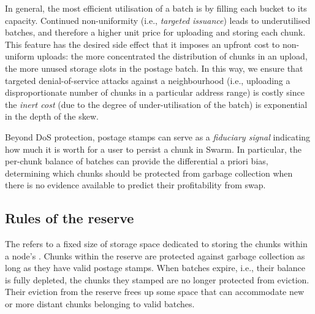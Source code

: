 In general, the most efficient utilisation of a batch is by filling each bucket to its capacity. 
%
%
%       
Continued non-uniformity (i.e., \emph{targeted issuance}) leads to underutilised batches, and therefore a higher unit price for uploading and storing each chunk. This feature has the desired side effect that it imposes an upfront cost to non-uniform uploads: the more concentrated the distribution of chunks in an upload, the more unused storage slots in the postage batch. In this way, we ensure that targeted denial-of-service attacks against a neighbourhood (i.e., uploading a disproportionate number of chunks in a particular address range) is costly since the \emph{inert cost} (due to the degree of under-utilisation of the batch) is exponential in the depth of the skew.

Beyond DoS protection, postage stamps can serve as a \emph{fiduciary signal} indicating how much it is worth for a user to persist a chunk in Swarm. In particular, the per-chunk balance of batches can provide the differential a priori bias, determining which chunks should be protected from garbage collection when there is no evidence available to predict their profitability from swap. 



\subsection{Rules of the reserve}\label{sec:reserve}


The  refers to a fixed size of storage space dedicated to storing the chunks within a node's . Chunks within the reserve are protected against garbage collection as long as they have valid postage stamps. When batches expire, i.e., their balance is fully depleted, the chunks they stamped are no longer protected from eviction. Their eviction from the reserve frees up some space that can accommodate new or more distant chunks belonging to valid batches.


